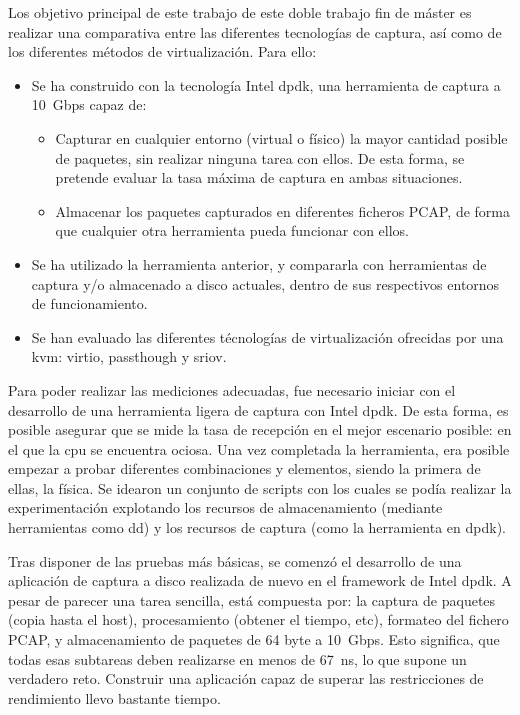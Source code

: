 \newpage
{}

Los objetivo principal de este trabajo de este doble trabajo fin de máster es realizar una comparativa entre las diferentes tecnologías de captura, así como de los diferentes métodos de virtualización. Para ello:

\begin{itemize}
\item Se ha construido con la tecnología Intel \gls{dpdk}, una herramienta de captura a 10~Gbps capaz de:
\begin{itemize}
\item Capturar en cualquier entorno (virtual o físico) la mayor cantidad posible de paquetes, sin realizar ninguna tarea con ellos. De esta forma, se pretende evaluar la tasa máxima de captura en ambas situaciones.
\item Almacenar los paquetes capturados en diferentes ficheros PCAP, de forma que cualquier otra herramienta pueda funcionar con ellos.
\end{itemize}
\item Se ha utilizado la herramienta anterior, y compararla con herramientas de captura y/o almacenado a disco actuales, dentro de sus respectivos entornos de funcionamiento.
\item Se han evaluado las diferentes técnologías de virtualización ofrecidas por una \gls{kvm}: \gls{virtio}, \gls{passthough} y \gls{sriov}.
\end{itemize}


Para poder realizar las mediciones adecuadas, fue necesario iniciar con el desarrollo de una herramienta ligera de captura con Intel \gls{dpdk}. De esta forma, es posible asegurar que se mide la tasa de recepción en el mejor escenario posible: en el que la \gls{cpu} se encuentra ociosa.
Una vez completada la herramienta, era posible empezar a probar diferentes combinaciones y elementos, siendo la primera de ellas, la física. Se idearon un conjunto de scripts con los cuales se podía realizar la experimentación explotando los recursos de almacenamiento (mediante herramientas como dd) y los recursos de captura (como la herramienta en \gls{dpdk}).

Tras disponer de las pruebas más básicas, se comenzó el desarrollo de una aplicación de captura a disco realizada de nuevo en el framework de Intel \gls{dpdk}. A pesar de parecer una tarea sencilla, está compuesta por: la captura de paquetes (copia hasta el host), procesamiento (obtener el tiempo, etc), formateo del fichero PCAP, y almacenamiento de paquetes de 64 byte a 10~Gbps. Esto significa, que todas esas subtareas deben realizarse en menos de 67~ns, lo que supone un verdadero reto. Construir una aplicación capaz de superar las restricciones de rendimiento llevo bastante tiempo.

